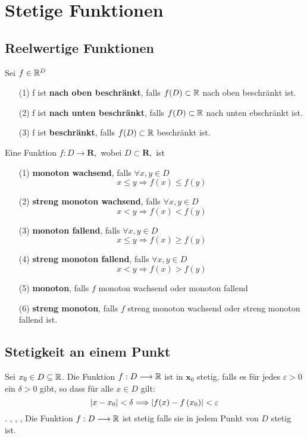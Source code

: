 \section{Stetige Funktionen}

\subsection{Reelwertige Funktionen}

\Def[3.1.1] Sei $f \in \mathbb{R}^D$
\begin{enumerate}
\item[(1)] f ist \textbf{nach oben beschränkt}, falls $f(D) \subset \mathbb{R}$ nach oben beschränkt ist.
\item[(2)] f ist \textbf{nach unten beschränkt}, falls $f(D) \subset \mathbb{R}$ nach unten ebschränkt ist.
\item[(3)] f ist \textbf{beschränkt}, falls $f(D) \subset \mathbb{R}$ beschränkt ist.
\end{enumerate}

\Def[3.1.2] Eine Funktion $f: D \longrightarrow \mathbf{R},$ wobei $D \subset \mathbf{R},$ ist
\begin{enumerate}
\item[(1)] \textbf{monoton wachsend}, falls $\forall x, y \in D$
\[
x \leqslant y \Longrightarrow f(x) \leqslant f(y)
\]
\item[(2)] \textbf{streng monoton wachsend}, falls $\forall x, y \in D$
\[
x<y \Longrightarrow f(x)<f(y)
\]
\item[(3)] \textbf{monoton fallend}, falls $\forall x, y \in D$
\[
x \leqslant y \Longrightarrow f(x) \geqslant f(y)
\]
\item[(4)] \textbf{streng monoton fallend}, falls $\forall x, y \in D$
\[
x<y \Longrightarrow f(x)>f(y)
\]
\item[(5)] \textbf{monoton}, falls $f$ monoton wachsend oder monoton fallend
\item[(6)] \textbf{streng monoton}, falls $f$ streng monoton wachsend oder streng monoton fallend ist.
\end{enumerate}

\subsection{Stetigkeit an einem Punkt}
\Def[3.2.1] Sei $x_{0} \in D \subseteq \mathbb{R}$. Die Funktion $f: D \longrightarrow \mathbb{R}$ ist in $\boldsymbol{x}_{0}$ stetig, falls es für jedes $\varepsilon>0$ ein $\delta>0$ gibt, so dass für alle $x \in D$ gilt: $$\left\lvert x-x_{0} \right\rvert<\delta \Longrightarrow\left\lvert f(x)-f\left(x_{0}\right) \right\rvert<\varepsilon$$.
\sep
\sep
\sep
\Def Die Funktion $f: D \longrightarrow \mathbb{R}$ ist stetig falls sie in jedem Punkt von $D$ stetig ist.

